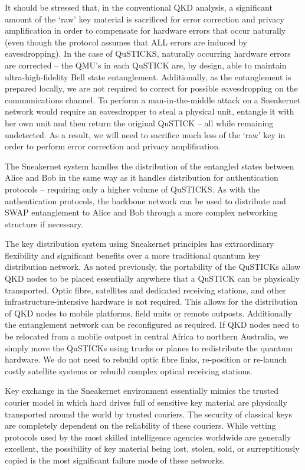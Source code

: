 \documentclass[twocolumn, aps, rmp, amsmath, amssymb, nofootinbib, superscriptaddress, longbibliography, floatfix, table-of-contents, eqsecnum]{revtex4-2}
\begin{document}
It should be stressed that, in the conventional QKD analysis, a significant amount of the `raw' key material is sacrificed for error correction and privacy amplification in order to compensate for hardware errors that occur naturally (even though the protocol assumes that ALL errors are induced by eavesdropping). In the case of QuSTICKS, naturally occurring hardware errors are corrected -- the QMU's in each QuSTICK are, by design, able to maintain ultra-high-fidelity Bell state entanglement. Additionally, as the entanglement is prepared locally, we are not required to correct for possible eavesdropping on the communications channel. To perform a man-in-the-middle attack on a Sneakernet network would require an eavesdropper to steal a physical unit, entangle it with her own unit and then return the original QuSTICK -- all while remaining undetected.  As a result, we will need to sacrifice much less of the `raw' key in order to perform error correction and privacy amplification. 

The Sneakernet system handles the distribution of the entangled states between Alice and Bob in the same way as it handles distribution for authentication protocols -- requiring only a higher volume of QuSTICKS. As with the authentication protocols, the backbone network can be used to distribute and SWAP entanglement to Alice and Bob through a more complex networking structure if necessary. 

The key distribution system using Sneakernet principles has extraordinary flexibility and significant benefits over a more traditional quantum key distribution network. As noted previously, the portability of the QuSTICKs allow QKD nodes to be placed essentially anywhere that a QuSTICK can be physically transported. Optic fibre, satellites and dedicated receiving stations, and other infrastructure-intensive hardware is not required. This allows for the distribution of QKD nodes to mobile platforms, field units or remote outposts. Additionally the entanglement network can be reconfigured as required. If QKD nodes need to be relocated from a mobile outpost in central Africa to northern Australia, we simply move the QuSTICKs using trucks or planes to redistribute the quantum hardware. We do not need to rebuild optic fibre links, re-position or re-launch costly satellite systems or rebuild complex optical receiving stations. 

Key exchange in the Sneakernet environment essentially mimics the trusted courier model in which hard drives full of sensitive key material are physically transported around the world by trusted couriers. The security of classical keys are completely dependent on the reliability of these couriers. While vetting protocols used by the most skilled intelligence agencies worldwide are generally excellent, the possibility of key material being lost, stolen, sold, or surreptitiously copied is the most significant failure mode of these networks. 
\end{document}
